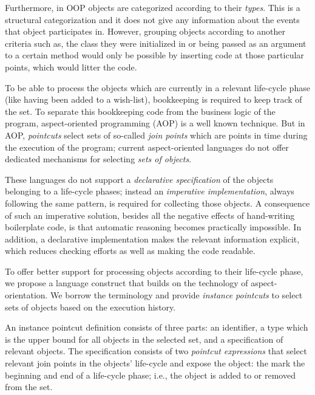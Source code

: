 Furthermore, in OOP objects are categorized according to their \emph{types}.
This is a structural categorization and it does not give any information about the events that object participates in.
However, grouping objects according to another criteria such as, the class they were initialized in or being passed as an argument to a certain method would only be possible by inserting code at those particular points, which would litter the code.

To be able to process the objects which are currently in a relevant life-cycle phase (like having been added to a wish-list), bookkeeping is required to keep track of the set. To separate this bookkeeping code from the business logic of the program, aspect-oriented programming (AOP) is a well known technique. But in AOP, \emph{pointcuts} select sets of so-called \emph{join points} which are points in time during the execution of the program; current aspect-oriented languages do not offer dedicated mechanisms for selecting \emph{sets of objects}.

These languages do not support a \emph{declarative specification} of the objects belonging to a life-cycle phases; instead an \emph{imperative implementation}, always following the same pattern, is required for collecting those objects.
A consequence of such an imperative solution, besides all the negative effects of hand-writing boilerplate code, is that automatic reasoning becomes practically impossible.
In addition, a declarative implementation makes the relevant information explicit, which reduces checking efforts as well as making the code readable.

To offer better support for processing objects according to their life-cycle phase, we propose a language construct that builds on the technology of aspect-orientation.
We borrow the terminology and provide \emph{instance pointcuts} to select sets of objects based on the execution history.

An instance pointcut definition consists of three parts: an identifier, a type which is the upper bound for all objects in the selected set, and a specification of relevant objects.
The specification consists of two \emph{pointcut expressions} that select relevant join points in the objects' life-cycle and expose the object: the mark the beginning and end of a life-cycle phase; i.e., the object is added to or removed from the set.

